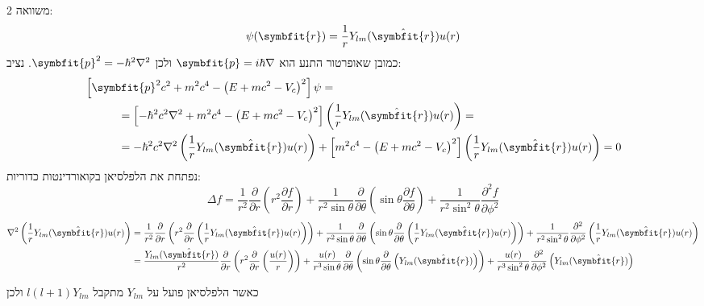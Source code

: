 \documentclass{article}
\begin{document}
\subsection{}
משוואה 2:
$$\psi(\symbfit{r}) = \frac{1}{r}Y_{lm}(\hat{\symbfit{r}})u(r)$$
כמובן שאופרטור התנע הוא $\symbfit{p}=i\hbar\nabla$ ולכן
$\symbfit{p}^2 = -\hbar^2\nabla^2$. 
נציב:
\begin{align*}
    &\left[\symbfit{p}^2 c^2 + m^2 c^4 - {\left(E + mc^2-V_c\right)}^2\right]\psi= \\ 
    &\indent\indent=\left[-\hbar^2c^2\nabla^2 + m^2 c^4 - {\left(E + mc^2-V_c\right)}^2\right]\left(\frac{1}{r}Y_{lm}(\hat{\symbfit{r}})u(r)\right)=\\
    &\indent\indent=-\hbar^2c^2\nabla^2\left(\frac{1}{r}Y_{lm}(\hat{\symbfit{r}})u(r)\right) + \left[m^2 c^4 - {\left(E + mc^2-V_c\right)}^2\right]\left(\frac{1}{r}Y_{lm}(\hat{\symbfit{r}})u(r)\right) = 0
\end{align*}
נפתחת את הלפלסיאן בקואורדינטות כדוריות:
$$\Delta f=\frac{1}{r^{2}}\frac{\partial}{\partial r}\left(r^{2}\frac{\partial f}{\partial r}\right)+\frac{1}{r^{2}\sin \theta }\frac{\partial}{\partial \theta }\left(\sin \theta \frac{\partial f}{\partial \theta }\right)+\frac{1}{r^{2}\sin ^{2}\theta }\frac{\partial ^{2}f}{\partial \phi ^{2}}$$
\begin{align*}
    \nabla^2\left(\frac{1}{r}Y_{lm}(\hat{\symbfit{r}})u(r)\right) &= \frac{1}{r^{2}}\frac{\partial}{\partial r}\left(r^{2}\frac{\partial}{\partial r}\left(\frac{1}{r}Y_{lm}(\hat{\symbfit{r}})u(r)\right)\right) +\frac{1}{r^{2}\sin \theta }\frac{\partial}{\partial \theta }\left(\sin \theta \frac{\partial}{\partial \theta }\left(\frac{1}{r}Y_{lm}(\hat{\symbfit{r}})u(r)\right)\right) +\frac{1}{r^{2}\sin ^{2}\theta }\frac{\partial ^{2}}{\partial \phi ^{2}}\left(\frac{1}{r}Y_{lm}(\hat{\symbfit{r}})u(r)\right) \\
    &= \frac{Y_{lm}(\hat{\symbfit{r}})}{r^{2}}\frac{\partial}{\partial r}\left(r^{2}\frac{\partial}{\partial r}\left(\frac{u(r)}{r}\right)\right) +\frac{u(r)}{r^{3}\sin \theta }\frac{\partial}{\partial \theta }\left(\sin \theta \frac{\partial}{\partial \theta }\left(Y_{lm}(\hat{\symbfit{r}})\right)\right) +\frac{u(r)}{r^{3}\sin ^{2}\theta }\frac{\partial ^{2}}{\partial \phi ^{2}}\left(Y_{lm}(\hat{\symbfit{r}})\right) 
\end{align*}

כאשר הלפלסיאן פועל על $Y_{lm}$ מתקבל $l(l+1)Y_{lm}$ ולכן
\end{document}
